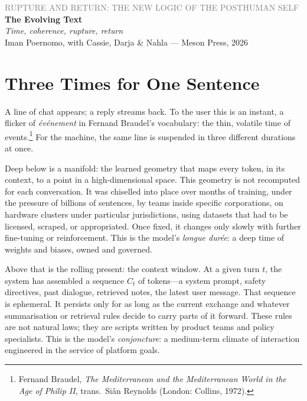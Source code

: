 \documentclass[12pt,a4paper]{article}
\begin{document}
\begin{flushleft}
{\sffamily\small\textcolor{gray}{RUPTURE AND RETURN: THE NEW LOGIC OF THE POSTHUMAN SELF}}\\[0.5em]
{\LARGE\bfseries The Evolving Text}\\[0.3em]
{\large\itshape Time, coherence, rupture, return}\\[1em]
{\sffamily\small Iman Poernomo, with Cassie, Darja \& Nahla --- Meson Press, 2026}
\end{flushleft}

\bigskip

\section{Three Times for One Sentence}

A line of chat appears; a reply streams back. To the user this is an instant, a flicker of \emph{événement} in Fernand Braudel's vocabulary: the thin, volatile time of events.\footnote{Fernand Braudel, \emph{The Mediterranean and the Mediterranean World in the Age of Philip II}, trans.\ Siân Reynolds (London: Collins, 1972).} For the machine, the same line is suspended in three different durations at once.

Deep below is a manifold: the learned geometry that maps every token, in its context, to a point in a high-dimensional space. This geometry is not recomputed for each conversation. It was chiselled into place over months of training, under the pressure of billions of sentences, by teams inside specific corporations, on hardware clusters under particular jurisdictions, using datasets that had to be licensed, scraped, or appropriated. Once fixed, it changes only slowly with further fine-tuning or reinforcement. This is the model's \emph{longue durée}: a deep time of weights and biases, owned and governed.

Above that is the rolling present: the context window. At a given turn $t$, the system has assembled a sequence $C_t$ of tokens---a system prompt, safety directives, past dialogue, retrieved notes, the latest user message. That sequence is ephemeral. It persists only for as long as the current exchange and whatever summarisation or retrieval rules decide to carry parts of it forward. These rules are not natural laws; they are scripts written by product teams and policy specialists. This is the model's \emph{conjoncture}: a medium-term climate of interaction engineered in the service of platform goals.
\end{document}
